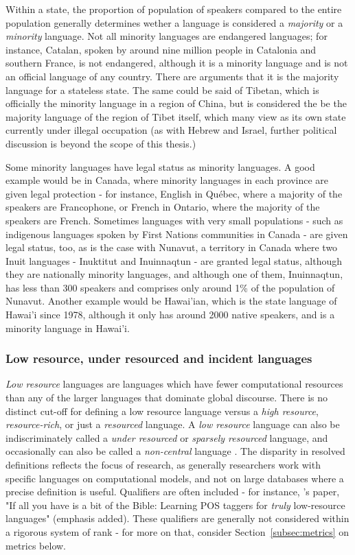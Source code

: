 Within a state, the proportion of population of speakers compared to the entire population generally determines wether a language is considered a \textit{majority} or a \textit{minority} language. Not all minority languages are endangered languages; for instance, Catalan, spoken by around nine million people in Catalonia and southern France, is not endangered, although it is a minority language and is not an official language of any country. There are arguments that it is the majority language for a stateless state. The same could be said of Tibetan, which is officially the minority language in a region of China, but is considered the be the majority language of the region of Tibet itself, which many view as its own state currently under illegal occupation (as with Hebrew and Israel, further political discussion is beyond the scope of this thesis.)

Some minority languages have legal status as minority languages. A good example would be in Canada, where minority languages in each province are given legal protection - for instance, English in Qu\'ebec, where a majority of the speakers are Francophone, or French in Ontario, where the majority of the speakers are French. Sometimes languages with very small populations - such as indigenous languages spoken by First Nations communities in Canada - are given legal status, too, as is the case with Nunavut, a territory in Canada where two Inuit languages - Inuktitut and Inuinnaqtun - are granted legal status, although they are nationally minority languages, and although one of them, Inuinnaqtun, has less than 300 speakers and comprises only around 1\% of the population of Nunavut. Another example would be Hawai'ian, which is the state language of Hawai'i since 1978, although it only has around 2000 native speakers, and is a minority language in Hawai'i. %


\subsubsection{Low resource, under resourced and incident languages}

\textit{Low resource} languages are languages which have fewer computational resources than any of the larger languages that dominate global discourse. There is no distinct cut-off for defining a low resource language versus a \textit{high resource}, \textit{resource-rich}, or just a \textit{resourced} language. A \textit{low resource} language can also be indiscriminately called a \textit{under resourced} or \textit{sparsely resourced} language, and occasionally can also be called a {\it non-central} language \citep{streiter2006implementing}. The disparity in resolved definitions reflects the focus of research, as generally researchers work with specific languages on computational models, and not on large databases where a precise definition is useful. Qualifiers are often included - for instance, \citet{agic2015if}'s paper, "If all you have is a bit of the Bible: Learning POS taggers for {\it truly} low-resource languages" (emphasis added). These qualifiers are generally not considered within a rigorous system of rank - for more on that, consider Section~\ref{subsec:metrics} on metrics below.

